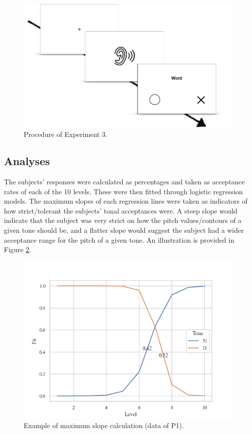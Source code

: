 \documentclass[12pt]{report}
\begin{document}
\begin{CJK}{UTF8}{bsmi}
\begin{figure}[h]
\centering
\includegraphics[width=.7\textwidth]{Figures/E3/Procedure.png}
\caption{Procedure of Experiment 3.}
\label{Figure:Experiment3Procedure}
\end{figure}

\subsection{Analyses}
The subjects' responses were calculated as percentages and taken as acceptance rates of each of the 10 levels. These were then fitted through logistic regression models. The maximum slopes of each regression lines were taken as indicators of how strict/tolerant the subjects' tonal acceptances were. A steep slope would indicate that the subject was very strict on how the pitch values/contours of a given tone should be, and a flatter slope would suggest the subject had a wider acceptance range for the pitch of a given tone. An illustration is provided in Figure \ref{Figure:E3ProcessedExample}.

\begin{figure}[h]
\centering
\includegraphics[width=\textwidth]{Figures/E3/ProcessedExample.png}
\caption{Example of maximum slope calculation (data of P1).}
\label{Figure:E3ProcessedExample}
\end{figure}


\end{CJK}
\end{document}
